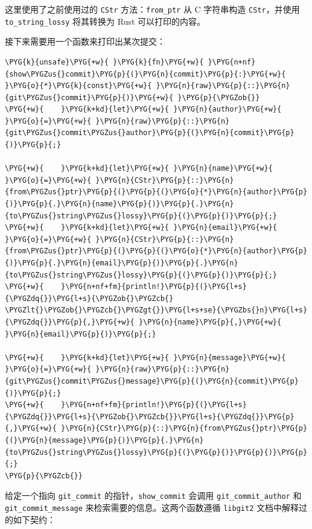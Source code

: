 这里使用了之前使用过的 \texttt{CStr} 方法：\texttt{from\_ptr} 从 C 字符串构造 \texttt{CStr}，并使用 \texttt{to\_string\_lossy} 将其转换为 Rust 可以打印的内容。

接下来需要用一个函数来打印出某次提交：

\begin{Verbatim}[commandchars=\\\{\},breaklines=true,breakanywhere=true,fontsize=\codefont,xleftmargin=17bp]
\PYG{k}{unsafe}\PYG{+w}{ }\PYG{k}{fn}\PYG{+w}{ }\PYG{n+nf}{show\PYGZus{}commit}\PYG{p}{(}\PYG{n}{commit}\PYG{p}{:}\PYG{+w}{ }\PYG{o}{*}\PYG{k}{const}\PYG{+w}{ }\PYG{n}{raw}\PYG{p}{::}\PYG{n}{git\PYGZus{}commit}\PYG{p}{)}\PYG{+w}{ }\PYG{p}{\PYGZob{}}
\PYG{+w}{    }\PYG{k+kd}{let}\PYG{+w}{ }\PYG{n}{author}\PYG{+w}{ }\PYG{o}{=}\PYG{+w}{ }\PYG{n}{raw}\PYG{p}{::}\PYG{n}{git\PYGZus{}commit\PYGZus{}author}\PYG{p}{(}\PYG{n}{commit}\PYG{p}{)}\PYG{p}{;}

\PYG{+w}{    }\PYG{k+kd}{let}\PYG{+w}{ }\PYG{n}{name}\PYG{+w}{ }\PYG{o}{=}\PYG{+w}{ }\PYG{n}{CStr}\PYG{p}{::}\PYG{n}{from\PYGZus{}ptr}\PYG{p}{(}\PYG{p}{(}\PYG{o}{*}\PYG{n}{author}\PYG{p}{)}\PYG{p}{.}\PYG{n}{name}\PYG{p}{)}\PYG{p}{.}\PYG{n}{to\PYGZus{}string\PYGZus{}lossy}\PYG{p}{(}\PYG{p}{)}\PYG{p}{;}
\PYG{+w}{    }\PYG{k+kd}{let}\PYG{+w}{ }\PYG{n}{email}\PYG{+w}{ }\PYG{o}{=}\PYG{+w}{ }\PYG{n}{CStr}\PYG{p}{::}\PYG{n}{from\PYGZus{}ptr}\PYG{p}{(}\PYG{p}{(}\PYG{o}{*}\PYG{n}{author}\PYG{p}{)}\PYG{p}{.}\PYG{n}{email}\PYG{p}{)}\PYG{p}{.}\PYG{n}{to\PYGZus{}string\PYGZus{}lossy}\PYG{p}{(}\PYG{p}{)}\PYG{p}{;}
\PYG{+w}{    }\PYG{n+nf+fm}{println!}\PYG{p}{(}\PYG{l+s}{\PYGZdq{}}\PYG{l+s}{\PYGZob{}\PYGZcb{} \PYGZlt{}\PYGZob{}\PYGZcb{}\PYGZgt{}}\PYG{l+s+se}{\PYGZbs{}n}\PYG{l+s}{\PYGZdq{}}\PYG{p}{,}\PYG{+w}{ }\PYG{n}{name}\PYG{p}{,}\PYG{+w}{ }\PYG{n}{email}\PYG{p}{)}\PYG{p}{;}

\PYG{+w}{    }\PYG{k+kd}{let}\PYG{+w}{ }\PYG{n}{message}\PYG{+w}{ }\PYG{o}{=}\PYG{+w}{ }\PYG{n}{raw}\PYG{p}{::}\PYG{n}{git\PYGZus{}commit\PYGZus{}message}\PYG{p}{(}\PYG{n}{commit}\PYG{p}{)}\PYG{p}{;}
\PYG{+w}{    }\PYG{n+nf+fm}{println!}\PYG{p}{(}\PYG{l+s}{\PYGZdq{}}\PYG{l+s}{\PYGZob{}\PYGZcb{}}\PYG{l+s}{\PYGZdq{}}\PYG{p}{,}\PYG{+w}{ }\PYG{n}{CStr}\PYG{p}{::}\PYG{n}{from\PYGZus{}ptr}\PYG{p}{(}\PYG{n}{message}\PYG{p}{)}\PYG{p}{.}\PYG{n}{to\PYGZus{}string\PYGZus{}lossy}\PYG{p}{(}\PYG{p}{)}\PYG{p}{)}\PYG{p}{;}
\PYG{p}{\PYGZcb{}}
\end{Verbatim}

给定一个指向 \texttt{git\_commit} 的指针，\texttt{show\_commit} 会调用 \texttt{git\_commit\_author} 和 \texttt{git\_commit\_message} 来检索需要的信息。这两个函数遵循 \texttt{libgit2} 文档中解释过的如下契约：

